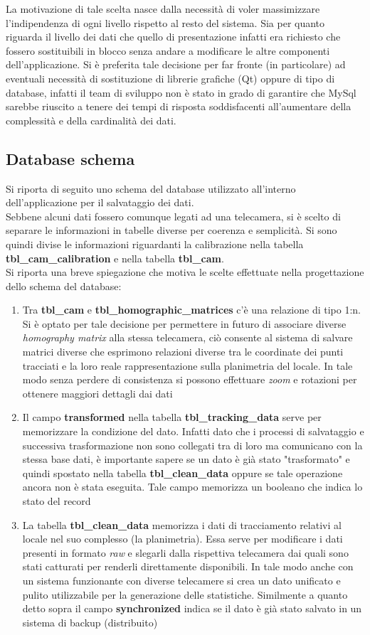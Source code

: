 \documentclass[a4paper,13pt,twoside]{article}
\begin{document}
La motivazione di tale scelta nasce dalla necessità di voler massimizzare l'indipendenza di ogni livello rispetto al resto del sistema. Sia per quanto riguarda il livello dei dati che quello di presentazione infatti era richiesto che fossero sostituibili in blocco senza andare a modificare le altre componenti dell'applicazione. Si è preferita tale decisione per far fronte (in particolare) ad eventuali necessità di sostituzione di librerie grafiche (Qt) oppure di tipo di database, infatti il team di sviluppo non è stato in grado di garantire che MySql sarebbe riuscito a tenere dei tempi di risposta soddisfacenti all'aumentare della complessità e della cardinalità dei dati.
\newpage
\subsection{Database schema} \label{sec:dbschema}
Si riporta di seguito uno schema del database utilizzato all'interno dell'applicazione per il salvataggio dei dati. \\
Sebbene alcuni dati fossero comunque legati ad una telecamera, si è scelto di separare le informazioni in tabelle diverse per coerenza e semplicità. Si sono quindi divise le informazioni riguardanti la calibrazione nella tabella \textbf{tbl_cam_calibration} e nella tabella \textbf{tbl_cam}.\\
Si riporta una breve spiegazione che motiva le scelte effettuate nella progettazione dello schema del database:
\begin{enumerate}
	\item Tra \textbf{tbl_cam} e \textbf{tbl_homographic_matrices} c'è una relazione di tipo 1:n. Si è optato per tale decisione per permettere in futuro di associare diverse \textit{homography matrix} alla stessa telecamera, ciò consente al sistema di salvare matrici diverse che esprimono relazioni diverse tra le coordinate dei punti tracciati e la loro reale rappresentazione sulla planimetria del locale. In tale modo senza perdere di consistenza si possono effettuare \textit{zoom} e rotazioni per ottenere maggiori dettagli dai dati
	\item Il campo \textbf{transformed} nella tabella \textbf{tbl_tracking_data} serve per memorizzare la condizione del dato. Infatti dato che i processi di salvataggio e successiva trasformazione non sono collegati tra di loro ma comunicano con la stessa base dati, è importante sapere se un dato è già stato "trasformato" e quindi spostato nella tabella \textbf{tbl_clean_data} oppure se tale operazione ancora non è stata eseguita. Tale campo memorizza un booleano che indica lo stato del record
	\item La tabella \textbf{tbl_clean_data} memorizza i dati di tracciamento relativi al locale nel suo complesso (la planimetria). Essa serve per modificare i dati presenti in formato \textit{raw} e slegarli dalla rispettiva telecamera dai quali sono stati catturati per renderli direttamente disponibili. In tale modo anche con un sistema funzionante con diverse telecamere si crea un dato unificato e pulito utilizzabile per la generazione delle statistiche. Similmente a quanto detto sopra il campo \textbf{synchronized} indica se il dato è già stato salvato in un sistema di backup (distribuito)
\end{enumerate}
\end{document}
